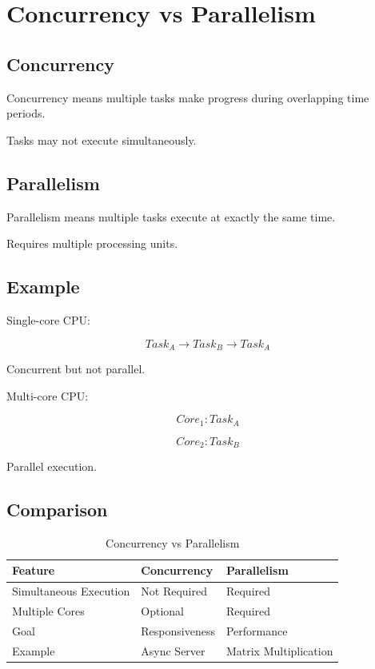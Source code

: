 \section{Concurrency vs Parallelism}

\subsection{Concurrency}

Concurrency means multiple tasks make progress during overlapping time periods.

Tasks may not execute simultaneously.

\subsection{Parallelism}

Parallelism means multiple tasks execute at exactly the same time.

Requires multiple processing units.

\subsection{Example}

Single-core CPU:

\[
Task_A \rightarrow Task_B \rightarrow Task_A
\]

Concurrent but not parallel.

Multi-core CPU:

\[
Core_1: Task_A
\]

\[
Core_2: Task_B
\]

Parallel execution.

\subsection{Comparison}

\begin{table}[h]
\centering
\begin{tabular}{|p{4cm}|p{5cm}|p{5cm}|}
\hline
Feature & Concurrency & Parallelism \\
\hline
Simultaneous Execution & Not Required & Required \\
\hline
Multiple Cores & Optional & Required \\
\hline
Goal & Responsiveness & Performance \\
\hline
Example & Async Server & Matrix Multiplication \\
\hline
\end{tabular}
\caption{Concurrency vs Parallelism}
\end{table}

